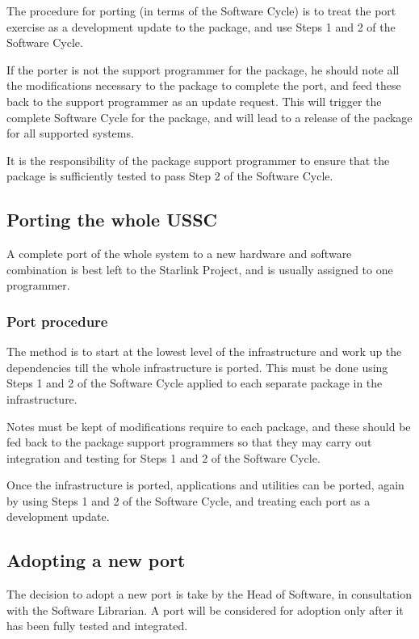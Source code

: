 \documentclass[twoside,11pt]{article}
\newcommand{\xlabel}[1]{}
\begin{document}
The procedure for porting (in terms of the Software Cycle) is to treat 
the port exercise as a development update to the package, and use Steps
1 and 2 of the Software Cycle.  

If the porter is not the support programmer for the package, he should
note all the modifications necessary to the package to complete the
port, and feed these back to the support programmer as an update
request. This will trigger the complete Software Cycle for the package,
and will lead to a release of the package for all supported systems.

It is the responsibility of the package support programmer to ensure that
the package is sufficiently tested to pass Step 2 of the Software Cycle.

\subsection{\label{porting_the_whole_ussc}\xlabel{porting_the_whole_ussc}Porting the whole USSC}

A complete port of the whole system to a new hardware and software
combination is best left to the Starlink Project, and is usually
assigned to one programmer.  

\subsubsection{Port procedure}

The method is to start at the lowest level of the infrastructure and
work up the dependencies till the whole infrastructure is ported.
This must be done using Steps 1 and 2 of the Software Cycle applied
to each separate package in the infrastructure.  

Notes must be kept of modifications require to each package, and these
should be fed back to the package support programmers so that they may
carry out integration and testing for Steps 1 and 2 of the Software
Cycle.

Once the infrastructure is ported, applications and utilities can be
ported, again by using Steps 1 and 2 of the Software Cycle, and
treating each port as a development update.

\subsection{\label{adpopting_a_new_port}\xlabel{adpopting_a_new_port}Adopting a new port}

The decision to adopt a new port is take by the Head of Software, in
consultation with the Software Librarian.  A port will be considered
for adoption only after it has been fully tested and integrated.
\end{document}
